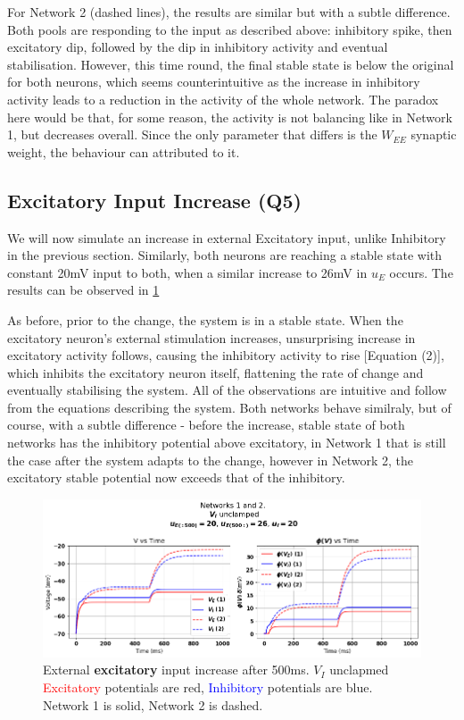 \documentclass[10pt,twocolumn]{article}
\begin{document}
For Network 2 (dashed lines), the results are similar but with a subtle difference. Both pools
are responding to the input as described above: inhibitory spike, then excitatory dip,
followed by the dip in inhibitory activity and eventual stabilisation. However,
this time round, the final stable state is below the original for both neurons,
which seems counterintuitive as the increase in inhibitory activity leads
to a reduction in the activity of the whole network. The paradox here would
be that, for some reason, the activity is not balancing like in Network 1,
but decreases overall. Since the only parameter that differs is the
$W_{EE}$ synaptic weight, the behaviour can attributed to it.

\subsection{Excitatory Input Increase (Q5)}
We will now simulate an increase in external Excitatory input, unlike Inhibitory
in the previous section. Similarly, both neurons are reaching a stable state
with constant 20mV input to both, when a similar increase to 26mV in $u_E$ occurs.
The results can be observed in \ref{fig:e-input-unclamped}

As before, prior to the change, the system is in a stable state. When the
excitatory neuron's external stimulation increases, unsurprising increase
in excitatory activity follows, causing the inhibitory activity to rise
    [Equation (2)], which inhibits the excitatory neuron itself, flattening
the rate of change and eventually stabilising the system.
All of the observations are intuitive and follow from the equations
describing the system. Both networks behave similraly, but of course,
with a subtle difference - before the increase, stable state of
both networks has the inhibitory potential above excitatory,
in Network 1 that is still the case after the system adapts to the
change, however in Network 2, the excitatory stable potential now
exceeds that of the inhibitory.

\begin{figure}
    \centering
    \captionsetup{justification=centering}
    \includegraphics[width=1\textwidth]{images/12-E_input.png}
    \caption{External \textbf{excitatory} input increase after 500ms. $V_I$ unclapmed \hspace{\textwidth}
        \textcolor{red}{Excitatory} potentials are red, \textcolor{blue}{Inhibitory} potentials are blue.\hspace{\textwidth}
        Network 1 is solid, Network 2 is dashed.}
    \label{fig:e-input-unclamped}
\end{figure}
\end{document}
